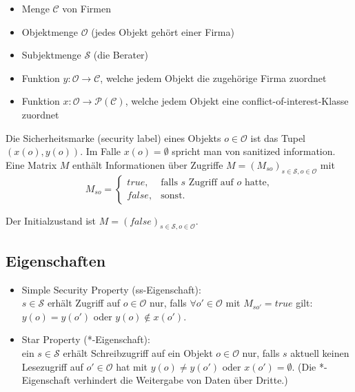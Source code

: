 \documentclass[a4paper,twoside,DIV15,BCOR12mm]{scrbook}
\begin{document}
\begin{itemize}
	\item Menge $\mathcal{C}$ von Firmen
	\item Objektmenge $\mathcal{O}$ (jedes Objekt gehört einer Firma)
	\item Subjektmenge $\mathcal{S}$ (die Berater)
	\item Funktion $y \colon \mathcal{O} \rightarrow \mathcal{C}$, welche jedem Objekt die zugehörige Firma zuordnet
	\item Funktion $x \colon \mathcal{O} \rightarrow \mathcal{P}(\mathcal{C})$, welche jedem Objekt eine conflict-of-interest-Klasse zuordnet
\end{itemize}

Die Sicherheitsmarke (security label) eines Objekts $o \in \mathcal{O}$ ist das Tupel $(x(o), y(o))$. Im Falle $x(o) = \emptyset$ spricht man von \glqq sanitized information\grqq.\\

Eine Matrix $M$ enthält Informationen über Zugriffe $M = (M_{so})_{s \in \mathcal{S}, o \in \mathcal{O}}$ mit
$$M_{so} = 	\begin{cases}
				true,  & \text{falls }s\text{ Zugriff auf }o\text{ hatte,}\\
				false, & \text{sonst.}
			\end{cases}$$
			
Der Initialzustand ist $M = (false)_{s \in \mathcal{S}, o \in \mathcal{O}}$.

\subsection{Eigenschaften}

\begin{itemize}
	\item Simple Security Property (ss-Eigenschaft):\\ $s \in \mathcal{S}$ erhält Zugriff auf $o \in \mathcal{O}$ nur, falls $\forall o' \in \mathcal{O}$ mit $M_{so'} = true$ gilt: $y(o) = y(o')$ oder $y(o) \notin x(o')$.
	\item Star Property (*-Eigenschaft):\\ ein $s \in \mathcal{S}$ erhält Schreibzugriff auf ein Objekt $o \in \mathcal{O}$ nur, falls $s$ aktuell keinen Lesezugriff auf $o' \in \mathcal{O}$ hat mit $y(o) \neq y(o')$ oder $x(o') = \emptyset$. (Die *-Eigenschaft verhindert die Weitergabe von Daten über Dritte.)
\end{itemize}
\end{document}
